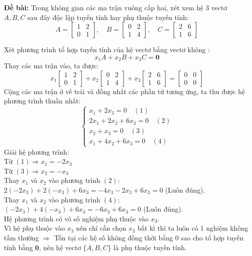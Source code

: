 \documentclass[12pt,a4paper]{article}
\begin{document}
\textbf{Đề bài:} Trong không gian các ma trận vuông cấp hai, xét xem hệ 3 vectơ $A, B, C$ sau đây độc lập tuyến tính hay phụ thuộc tuyến tính:
$$A = \begin{bmatrix} 1 & 2 \\ 0 & 1 \end{bmatrix}, \quad B = \begin{bmatrix} 0 & 2 \\ 1 & 4 \end{bmatrix}, \quad C = \begin{bmatrix} 2 & 6 \\ 1 & 6 \end{bmatrix}$$

Xét phương trình tổ hợp tuyến tính của hệ vectơ bằng vectơ không :
$$x_1A + x_2B + x_3C = \mathbf{0}$$
Thay các ma trận vào, ta được:
$$x_1 \begin{bmatrix} 1 & 2 \\ 0 & 1 \end{bmatrix} + x_2 \begin{bmatrix} 0 & 2 \\ 1 & 4 \end{bmatrix} + x_3 \begin{bmatrix} 2 & 6 \\ 1 & 6 \end{bmatrix} = \begin{bmatrix} 0 & 0 \\ 0 & 0 \end{bmatrix}$$
Cộng các ma trận ở vế trái và đồng nhất các phần tử tương ứng, ta thu được hệ phương trình thuần nhất:
$$\begin{cases}
x_1 + 2x_3 = 0 \quad (1) \\
2x_1 + 2x_2 + 6x_3 = 0 \quad (2) \\
x_2 + x_3 = 0 \quad (3) \\
x_1 + 4x_2 + 6x_3 = 0 \quad (4)
\end{cases}$$
Giải hệ phương trình:\\
Từ $(1) \Rightarrow x_1 = -2x_3$\\
Từ $(3) \Rightarrow x_2 = -x_3$\\
Thay $x_1$ và $x_2$ vào phương trình $(2)$: $2(-2x_3) + 2(-x_3) + 6x_3 = -4x_3 - 2x_3 + 6x_3 = 0$ (Luôn đúng).\\
Thay $x_1$ và $x_2$ vào phương trình $(4)$: $(-2x_3) + 4(-x_3) + 6x_3 = -6x_3 + 6x_3 = 0$ (Luôn đúng).\\
Hệ phương trình có vô số nghiệm phụ thuộc vào $x_3$.\\
Vì hệ phụ thuộc vào $x_3$ nên chỉ cần chọn $x_3$ bất kì thì ta luôn có 1 nghiệm không tầm thường $\Rightarrow$ Tồn tại các hệ số không đồng thời bằng $0$ sao cho tổ hợp tuyến tính bằng $\mathbf{0}$, nên hệ vectơ $\{A, B, C\}$ là phụ thuộc tuyến tính.
\end{document}
